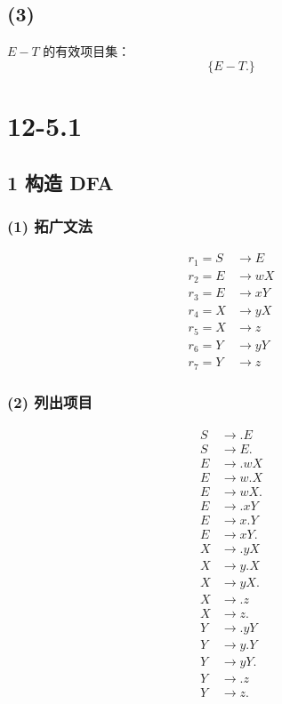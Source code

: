 \documentclass[UTF8]{ctexart}
\begin{document}
    \subsection*{(3)}
        $E-T$ 的有效项目集：
        $$\{E-T.\}$$

\section*{12-5.1}
    \subsection*{1 构造 DFA}
        \subsubsection*{(1) 拓广文法}
            \begin{align*}
                r_1 = S &\to E \\
                r_2 = E &\to wX \\
                r_3 = E &\to xY \\
                r_4 = X &\to yX \\
                r_5 = X &\to z \\
                r_6 = Y &\to yY \\
                r_7 = Y &\to z
            \end{align*}

        \subsubsection*{(2) 列出项目}
            \begin{align*}
                S &\to .E \\
                S &\to E. \\
                E &\to .wX \\
                E &\to w.X \\
                E &\to wX. \\
                E &\to .xY \\
                E &\to x.Y \\
                E &\to xY. \\
                X &\to .yX \\
                X &\to y.X \\
                X &\to yX. \\
                X &\to .z \\
                X &\to z. \\
                Y &\to .yY \\
                Y &\to y.Y \\
                Y &\to yY. \\
                Y &\to .z \\
                Y &\to z.
            \end{align*}
\end{document}
